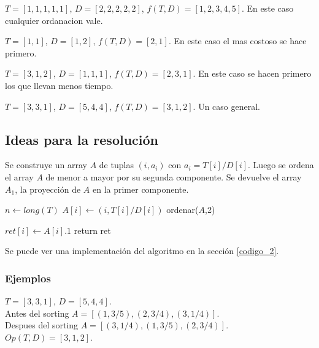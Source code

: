 \begin{Ejemplo}
$T = [1 , 1 , 1 , 1 , 1]$,
$D = [2 , 2 , 2 , 2 , 2]$,
$f(T,D) =  [1 , 2 , 3 , 4 , 5]$.
En este caso cualquier ordanacion vale.
\end{Ejemplo}

\begin{Ejemplo}
$T = [1 , 1]$,
$D = [1 , 2]$,
$f(T,D) =  [2 , 1]$.
En este caso el mas costoso se hace primero.
\end{Ejemplo}

\begin{Ejemplo}
$T = [3 , 1, 2]$,
$D = [1 , 1, 1]$,
$f(T,D) =  [2 , 3, 1]$.
En este caso se hacen primero los que llevan menos tiempo.
\end{Ejemplo}

\begin{Ejemplo}
$T = [3 , 3, 1]$,
$D = [5 , 4, 4]$,
$f(T,D) =  [3 , 1, 2]$.
Un caso general.
\end{Ejemplo}

\subsection{Ideas para la resoluci\'on}

Se construye un array $A$ de tuplas $( i , a_i )$ con $ a_i = T[i] / D[i] $. Luego se ordena el array $A$ de menor a mayor por su segunda componente. Se devuelve el array $A_1$, la proyecci\'on de $A$ en la primer componente.\\

\begin{algorithmic}
\Loop
	\State $n \leftarrow long(T)$
		\State $A[i] \leftarrow ( i , T[i] / D[i] )$
	\EndFor
	\State ordenar($A$,2) 
	
	\State $ret[i] \leftarrow A[i]$.$1$ 
	\EndFor
	\State return ret
\EndLoop
\end{algorithmic}

Se puede ver una implementaci\'on del algoritmo en la secci\'on \ref{codigo_2}.
\subsubsection{Ejemplos}

\begin{Ejemplo}
$T = [3 , 3, 1]$,
$D = [5 , 4, 4]$.\\
Antes del sorting $A = [ ( 1 , 3/5 ) , ( 2 , 3/4 ) , ( 3 , 1/4 ) ]$.\\
Despues del sorting $A = [ ( 3 , 1/4 ) , ( 1 , 3/5 ) , ( 2 , 3/4 ) ]$.\\
$Op(T,D) =  [3 , 1, 2]$.
\end{Ejemplo}


